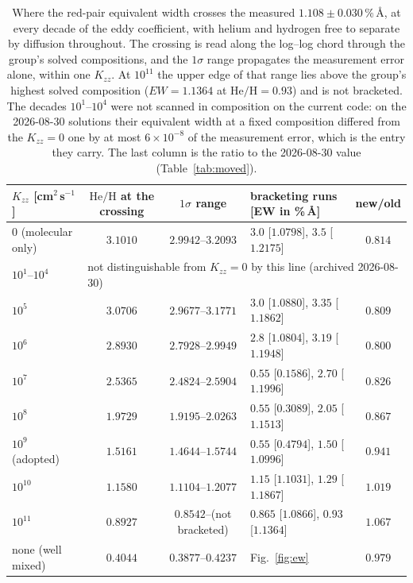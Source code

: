\documentclass[english,a4paper]{my_memo}
\begin{document}
\begin{table}[htbp]\centering
\caption{Where the red-pair equivalent width crosses the measured
$1.108 \pm 0.030$\,\%\,\AA, at every decade of the eddy coefficient, with
helium and hydrogen free to separate by diffusion throughout. The crossing is
read along the log--log chord through the group's solved compositions, and
the $1\sigma$ range propagates the measurement error alone, within one
$K_{zz}$. At $10^{11}$ the upper edge of that range lies above the group's
highest solved composition ($EW = 1.1364$ at $\mathrm{He/H} = 0.93$) and is
not bracketed. The decades $10^{1}$--$10^{4}$ were not scanned in composition
on the current code: on the 2026-08-30 solutions their equivalent width at a
fixed composition differed from the $K_{zz} = 0$ one by at most
$6\times10^{-8}$ of the measurement error, which is the entry they carry. The last column is
the ratio to the 2026-08-30 value (Table~\ref{tab:moved}).}
\label{tab:kzzcross}
\begin{tabular}{lcclc}
\toprule
$K_{zz}$ [cm$^2$\,s$^{-1}$] & $\mathrm{He/H}$ at the crossing &
$1\sigma$ range & bracketing runs [EW in \%\,\AA] & new/old \\
\midrule
$0$ (molecular only) & $3.1010$ & $2.9942$--$3.2093$ &
$3.0$ [$1.0798$], $3.5$ [$1.2175$] & $0.814$ \\
$10^{1}$--$10^{4}$ & \multicolumn{4}{l}{not distinguishable from
$K_{zz} = 0$ by this line (archived 2026-08-30)} \\
$10^{5}$  & $3.0706$ & $2.9677$--$3.1771$ &
$3.0$ [$1.0880$], $3.35$ [$1.1862$] & $0.809$ \\
$10^{6}$  & $2.8930$ & $2.7928$--$2.9949$ &
$2.8$ [$1.0804$], $3.19$ [$1.1948$] & $0.800$ \\
$10^{7}$  & $2.5365$ & $2.4824$--$2.5904$ &
$0.55$ [$0.1586$], $2.70$ [$1.1996$] & $0.826$ \\
$10^{8}$  & $1.9729$ & $1.9195$--$2.0263$ &
$0.55$ [$0.3089$], $2.05$ [$1.1513$] & $0.867$ \\
$10^{9}$ (adopted) & $\mathbf{1.5161}$ & $1.4644$--$1.5744$ &
$0.55$ [$0.4794$], $1.50$ [$1.0996$] & $0.941$ \\
$10^{10}$ & $1.1580$ & $1.1104$--$1.2077$ &
$1.15$ [$1.1031$], $1.29$ [$1.1867$] & $1.019$ \\
$10^{11}$ & $0.8927$ & $0.8542$--(not bracketed) &
$0.865$ [$1.0866$], $0.93$ [$1.1364$] & $1.067$ \\
\midrule
none (well mixed) & $0.4044$ & $0.3877$--$0.4237$ & Fig.~\ref{fig:ew} &
$0.979$ \\
\bottomrule
\end{tabular}
\end{table}
\end{document}
